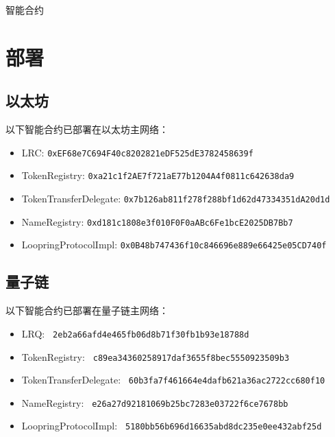 \documentclass[UTF8,nofonts]{ctexart}%
\makeatletter
\newenvironment{figurehere}
 {\def\@captype{figure}}
 {}
\makeatother
\begin{document}
\begin{appendices}
\begin{center}
\begin{figurehere}
\begin{tikzpicture}
\end{tikzpicture} 
\caption{智能合约}
\label{fig:smartcontracts}
\end{figurehere}
\end{center}

\section{部署}


\subsection{以太坊}
以下智能合约已部署在以太坊主网络：
\begin{itemize}
\item LRC: \verb|0xEF68e7C694F40c8202821eDF525dE3782458639f|
\item TokenRegistry: \verb|0xa21c1f2AE7f721aE77b1204A4f0811c642638da9|
\item TokenTransferDelegate: \verb|0x7b126ab811f278f288bf1d62d47334351dA20d1d|
\item NameRegistry: \verb|0xd181c1808e3f010F0F0aABc6Fe1bcE2025DB7Bb7|
\item LoopringProtocolImpl: \verb|0x0B48b747436f10c846696e889e66425e05CD740f|
\end{itemize}

\subsection{量子链}
以下智能合约已部署在量子链主网络：
\begin{itemize}
\item LRQ: \verb| 2eb2a66afd4e465fb06d8b71f30fb1b93e18788d |
\item TokenRegistry: \verb| c89ea34360258917daf3655f8bec5550923509b3 |
\item TokenTransferDelegate: \verb| 60b3fa7f461664e4dafb621a36ac2722cc680f10 |
\item NameRegistry: \verb| e26a27d92181069b25bc7283e03722f6ce7678bb |
\item LoopringProtocolImpl: \verb| 5180bb56b696d16635abd8dc235e0ee432abf25d |
\end{itemize}

\end{appendices}
\end{document}
